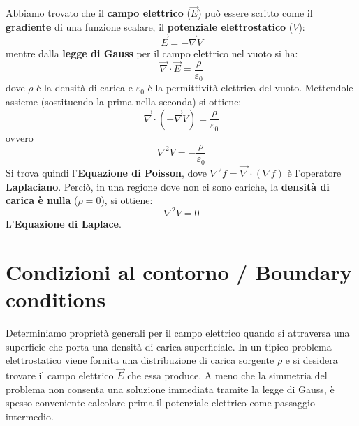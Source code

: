 \documentclass{book}
\begin{document}
Abbiamo trovato che il \textbf{campo elettrico} ($\vec{E}$) può essere scritto come il \textbf{gradiente} di una funzione scalare, il \textbf{potenziale elettrostatico} ($V$):
$$
\vec{E} = - \vec{\nabla} V
$$
mentre dalla \textbf{legge di Gauss} per il campo elettrico nel vuoto si ha:
$$
\vec{\nabla} \cdot \vec{E} = \frac{\rho}{\varepsilon_0}
$$
dove $\rho$ è la densità di carica e $\varepsilon_0$ è la permittività elettrica del vuoto.
Mettendole assieme (sostituendo la prima nella seconda) si ottiene:
$$
\vec{\nabla} \cdot (-\vec{\nabla} V) = \frac{\rho}{\varepsilon_0}
$$
ovvero
$$
\boxed{
\nabla^2 V = - \frac{\rho}{\varepsilon_0}}
$$
Si trova quindi l'\textbf{Equazione di Poisson}, dove $\nabla^2f = \vec{\nabla} \cdot (\nabla f)$ è l'operatore \textbf{Laplaciano}.
Perciò, in una regione dove non ci sono cariche, la \textbf{densità di carica è nulla} ($\rho=0$), si ottiene:
$$
\boxed{
\nabla^2 V = 0}
$$
 L'\textbf{Equazione di Laplace}.






\section{Condizioni al contorno / Boundary conditions}
Determiniamo proprietà generali per il campo elettrico quando si attraversa una superficie che porta una densità di carica superficiale.
In un tipico problema elettrostatico viene fornita una distribuzione di carica sorgente $\rho$ e si desidera trovare il campo elettrico $\vec{E}$ che essa produce. A meno che la simmetria del problema non consenta una soluzione immediata tramite la legge di Gauss, è spesso conveniente calcolare prima il potenziale elettrico come passaggio intermedio.
\end{document}
